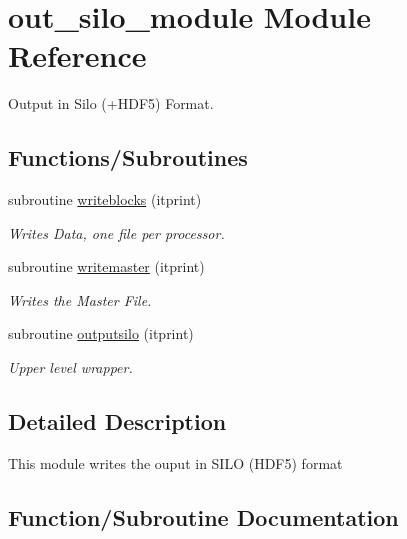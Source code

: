 \hypertarget{namespaceout__silo__module}{}\section{out\+\_\+silo\+\_\+module Module Reference}
\label{namespaceout__silo__module}


Output in Silo (+\+H\+D\+F5) Format.  


\subsection*{Functions/\+Subroutines}
\begin{DoxyCompactItemize}
\item 
subroutine \hyperlink{namespaceout__silo__module_acfa5a749647a6a7c95e48e3ad58e4139}{writeblocks} (itprint)
\begin{DoxyCompactList}\small\item\em Writes Data, one file per processor. \end{DoxyCompactList}\item 
subroutine \hyperlink{namespaceout__silo__module_aa984d6044bf34559a87a9020c4a07c3a}{writemaster} (itprint)
\begin{DoxyCompactList}\small\item\em Writes the Master File. \end{DoxyCompactList}\item 
subroutine \hyperlink{namespaceout__silo__module_a65763f848b9b5da2a20d8b55f53f8515}{outputsilo} (itprint)
\begin{DoxyCompactList}\small\item\em Upper level wrapper. \end{DoxyCompactList}\end{DoxyCompactItemize}


\subsection{Detailed Description}
This module writes the ouput in S\+I\+L\+O (H\+D\+F5) format 

\subsection{Function/\+Subroutine Documentation}
\hypertarget{namespaceout__silo__module_a65763f848b9b5da2a20d8b55f53f8515}{}
